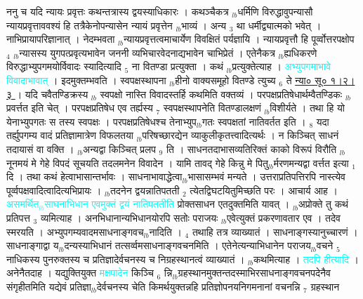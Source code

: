 \documentclass[article,12pt,a4paper]{memoir}%
\newcommand{\quotelemma}[1]{\textcolor{cyan}{#1}}
\begin{document}
	  
	  \pstart \leavevmode%
	ननु च यदि न्यायः प्रवृत्तः कथन्तत्रास्य द्वयस्याधिकारः । कथञ्चैकत्र {\tiny $_{lb}$}धर्मिणि विरुद्धावुपन्यासौ न्यायप्रवृत्ताववश्यं हि तत्रैकेनोपन्यासेन न्यायं प्रवृत्तेन {\tiny $_{lb}$}भाव्यं । अन्य {\tiny $_{3}$} था धर्मीद्व्यात्मको भवेत् । नाभिप्रायापरिज्ञानात् । नेदम्भवता {\tiny $_{lb}$}न्यायप्रवृत्तत्वमाचार्येण विवक्षितं पर्यज्ञायि । न्यायप्रवृत्तौ हि पूर्व्वोत्तरपक्षोप {\tiny $_{4}$} {\tiny $_{lb}$}न्यासस्य युगपत्प्रवृत्यभावेन जननी व्यभिचारवेदनाद्यभावेन चाभिप्रेतं । एतेनैकत्र {\tiny $_{lb}$}ह्यधिकरणे विरुद्धाभ्युपगमयोर्विवादः स्यादित्यादि {\tiny $_{5}$} ना वितण्डा प्रत्युक्ता । कथं {\tiny $_{lb}$}प्रत्युक्तेत्याह । \quotelemma{अभ्युपगमाभावे विवादाभावात्} । इदमुक्तम्भवति । स्वपक्षस्थापना {\tiny $_{lb}$}हीनो वाक्यसमूहो वितण्डे त्युच्य {\tiny $_{6}$} ते \href{http://sarit.indology.info/?cref=ns\%C5\%AB.1.2.3}{न्या० सू० १।२।३ } । यदि चवैतण्डिक्रस्य {\tiny $_{lb}$} \leavevmode{} स्वपक्षो नास्ति विवादस्तर्हि कथमिति वक्तव्यं । परपक्षप्रतिषेधार्थम्वैतण्डिकः {\tiny $_{lb}$}प्रवर्त्तत इति चेत् । परपक्षप्रतिषेध एव तर्ह्यस्य {\tiny $_{7}$} स्वपक्षस्थापनेति वितण्डालक्षणं {\tiny $_{lb}$}विशीर्यते । तथा हि यो येनाभ्युपगतः स तस्य स्वपक्षः । परपक्षप्रतिषेधश्च तेनाभ्युप{\tiny $_{lb}$}गतः स्वपक्षतां नातिवर्तत इति । {\tiny $_{8}$} यदा तर्ह्युपगम्य वादं प्रतिज्ञामात्रेण विफलतया {\tiny $_{lb}$}परिषच्छारद्येन व्याकुलीकृतत्त्वादित्यर्थः । न किञ्चित् साधनं तदायासं वा वक्ति । {\tiny $_{lb}$}अन्यद्वा किञ्चित् प्रलप {\tiny $_{9}$} \leavevmode{} ति । साधनतदाभासव्यतिरिक्तं काको विरूपं विरौति {\tiny $_{lb}$}नूनमयं मे गेहे विपदं सूचयति तदलमनेन विवादेन । यामि तावद् गेहे किन्नु मे पितु{\tiny $_{lb}$}र्मरणमन्यद्वा वर्त्तत इत्या {\tiny $_{1}$} दि । तथा कथं हेत्वाभासान्तर्भावः । साधनाभावाद्धेत्वा{\tiny $_{lb}$}भासासम्भवं मन्यते । उत्तराप्रतिपत्तिरपि नास्त्येव पूर्व्वपक्षवादित्वादित्यभिप्रायः । {\tiny $_{lb}$}तदनेन द्वयन्नातिपतती {\tiny $_{2}$} त्येतद्विघटयितुमिच्छति परः । आचार्य आह । \quotelemma{असमर्थित{\tiny $_{lb}$}साघनाभिधान एवमुक्तं द्वयं नातिपततीति} प्रोक्तसाधन एतदुक्तमिति यावत् । {\tiny $_{lb}$}अप्रोक्ते तु कथं प्रतिपत्त {\tiny $_{3}$} व्यमित्याह । अनभिधानान्यभिधानयोरपि सतोः पराजयः {\tiny $_{lb}$}एवेत्युक्तं प्रकरणावतार एव । तदेव स्मरयति । अभ्युपगम्यवादमसाधनाङ्गवच{\tiny $_{lb}$}नादिति । {\tiny $_{4}$} तथाहि तत्र व्याख्यातं । साधनाङ्गस्यानुच्चारणं । साधनाङ्गाद्वा य{\tiny $_{lb}$}दन्यस्याभिधानं तत्सर्व्वमसाधनाङ्गवचनमिति । एतेनेत्यन्याभिधानेन पराजय{\tiny $_{lb}$}वचने {\tiny $_{5}$} नाधिकस्य पुनरुक्तस्य च प्रतिज्ञादेर्वचनस्य च निग्रहस्थानत्वं व्याख्यातं । {\tiny $_{lb}$}कथमित्याह । \quotelemma{तदपि हीत्यादि} । अनेनैतदाह । यद्युक्तियुक्त \quotelemma{मक्षपादेन} किञ्चि {\tiny $_{6}$} न्नि{\tiny $_{lb}$}ग्रहस्थानमुक्तन्तदस्माभिरसाधनाङ्गवचनपदेनैव संगृहीतमिति यद्येवं प्रतिज्ञा{\tiny $_{lb}$}देर्वचनस्य चेति किमर्थयुक्तन्नहि प्रतिज्ञोपनयनिगमनानां वचनन्नि {\tiny $_{7}$} ग्रहस्थान 
\end{document}
